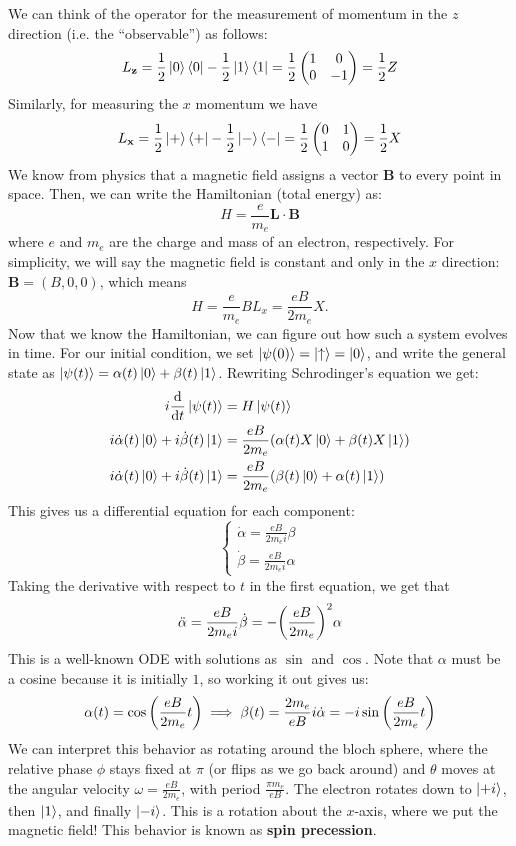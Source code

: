 We can think of the operator for the measurement of momentum in the $z$ direction (i.e. the ``observable'') as follows:
\[ L_{\mathbf{z}} = \frac{1}{2} \ket{0} \bra{0} - \frac{1}{2} \ket{1} \bra{1} = \frac{1}{2} \begin{pmatrix}
    1 & 0 \\ 0 & -1
 \end{pmatrix} = \frac{1}{2} Z \]
Similarly, for measuring the $x$ momentum we have
\[ L_{\mathbf{x}} = \frac{1}{2} \ket{+} \bra{+} - \frac{1}{2} \ket{-} \bra{-} = \frac{1}{2} \begin{pmatrix}
    0 & 1 \\ 1 & 0
 \end{pmatrix} = \frac{1}{2} X \]
We know from physics that a magnetic field assigns a vector $\mathbf{B}$ to every point in space. Then, we can write the Hamiltonian (total energy) as:
\[ H = \frac{e}{m_e} \mathbf{L} \cdot \mathbf{B} \]
where $e$ and $m_e$ are the charge and mass of an electron, respectively.
For simplicity, we will say the magnetic field is constant and only in the $x$ direction: $\mathbf{B} = (B, 0, 0)$,
which means 
\[H = \frac{e}{m_e} BL_x = \frac{eB}{2m_e} X.\] 
Now that we know the Hamiltonian, we can figure out how such a system evolves in time. For our
initial condition, we set $\ket{\psi(0)} = \ket{\uparrow} = \ket{0}$, and write the general state as $\ket{\psi(t)} = \alpha(t) \ket{0} + \beta(t) \ket{1}$.
Rewriting Schrodinger's equation we get:
\begin{align*}
    i \dv{}{t} \ket{\psi(t)} &= H \ket{\psi(t)} \\
    i \dot{\alpha}(t) \ket{0} + i \dot{\beta}(t) \ket{1} &= \frac{eB}{2m_e} \qty(\alpha(t) X \ket{0} + \beta(t) X \ket{1}) \\
    i \dot{\alpha}(t) \ket{0} + i \dot{\beta}(t) \ket{1} &= \frac{eB}{2m_e} \qty(\beta(t) \ket{0} + \alpha(t) \ket{1})
\end{align*}
This gives us a differential equation for each component:
\[ \begin{cases} \dot{\alpha} = \frac{eB}{2m_e i} \beta \\ \dot{\beta} = \frac{eB}{2m_e i} \alpha \end{cases} \]
Taking the derivative with respect to $t$ in the first equation, we get that
\begin{align*}
    \ddot{\alpha} = \frac{eB}{2m_e i} \dot{\beta} = - \qty(\frac{eB}{2m_e})^2 \alpha
\end{align*}
This is a well-known ODE with solutions as $\sin$ and $\cos$. Note that $\alpha$ must be a cosine because it is initially $1$, so working it out gives us:
\[ \alpha(t) = \cos\qty(\frac{eB}{2m_e} t) \implies \beta(t) = \frac{2m_e}{eB} i \dot{\alpha} = - i \sin\qty(\frac{eB}{2m_e} t) \]
We can interpret this behavior as rotating around the bloch sphere, where the relative phase $\phi$ stays fixed at $\pi$ (or flips as we go back around) and $\theta$ moves at the angular velocity 
$\omega = \frac{eB}{2m_e}$, with period $\frac{\pi m_e}{eB}$.
The electron rotates down to $\ket{+i}$, then $\ket{1}$, and finally $\ket{-i}$. This is a rotation about the $x$-axis, where we put the magnetic field! This behavior is known as \textbf{spin precession}.

